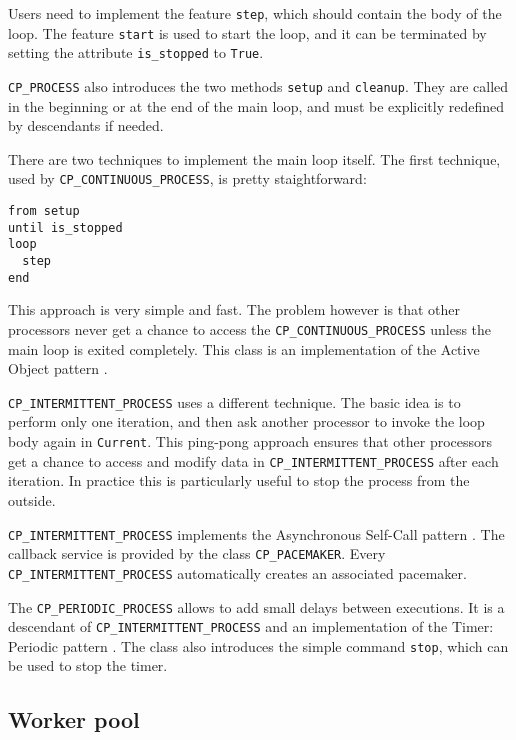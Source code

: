 Users need to implement the feature \lstinline!step!, which should contain the body of the loop.
The feature \lstinline!start! is used to start the loop, and it can be terminated by setting the attribute \lstinline!is_stopped! to \lstinline!True!.

\lstinline!CP_PROCESS! also introduces the two methods \lstinline!setup! and \lstinline!cleanup!.
They are called in the beginning or at the end of the main loop, and must be explicitly redefined by descendants if needed.

There are two techniques to implement the main loop itself.
The first technique, used by \lstinline!CP_CONTINUOUS_PROCESS!, is pretty staightforward:
\begin{lstlisting}
from setup
until is_stopped
loop
  step
end
\end{lstlisting}
This approach is very simple and fast. 
The problem however is that other processors never get a chance to access the \lstinline!CP_CONTINUOUS_PROCESS! unless the main loop is exited completely.
This class is an implementation of the Active Object pattern .

\lstinline!CP_INTERMITTENT_PROCESS! uses a different technique.
The basic idea is to perform only one iteration, and then ask another processor to invoke the loop body again in \lstinline!Current!.
This ping-pong approach ensures that other processors get a chance to access and modify data in \lstinline!CP_INTERMITTENT_PROCESS! after each iteration.
In practice this is particularly useful to stop the process from the outside.

\lstinline!CP_INTERMITTENT_PROCESS! implements the Asynchronous Self-Call pattern .
The callback service is provided by the class \lstinline!CP_PACEMAKER!.
Every \lstinline!CP_INTERMITTENT_PROCESS! automatically creates an associated pacemaker.

The \lstinline!CP_PERIODIC_PROCESS! allows to add small delays between executions. 
It is a descendant of \lstinline!CP_INTERMITTENT_PROCESS! and an implementation of the Timer: Periodic pattern .
The class also introduces the simple command \lstinline!stop!, which can be used to stop the timer.


\subsection{Worker pool}
\label{sec:worker_pool} 

